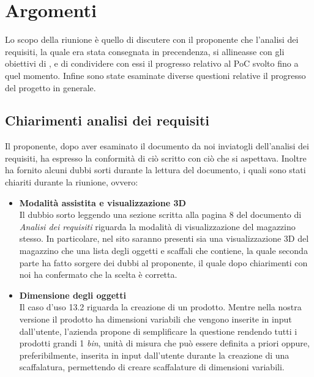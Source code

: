 \section{Argomenti} \label{sec:argomenti}
Lo scopo della riunione è quello di discutere con il proponente che l'analisi dei requisiti, la quale era stata consegnata in precendenza, si allineasse con gli obiettivi di \nomeAzienda, e di condividere con essi il progresso relativo al PoC svolto fino a quel momento. Infine sono state esaminate diverse questioni relative il progresso del progetto in generale.\\
\subsection{Chiarimenti analisi dei requisiti} \label{sec:argomenti:analisi}
    Il proponente, dopo aver esaminato il documento da noi inviatogli dell'analisi dei requisiti, ha espresso la conformità di ciò scritto con ciò che si aspettava. Inoltre ha fornito alcuni dubbi sorti durante la lettura del documento, i quali sono stati chiariti durante la riunione, ovvero:\\        \begin{itemize}
        \item \textbf{Modalità assistita e visualizzazione 3D} \\
        Il dubbio sorto leggendo una sezione scritta alla pagina 8 del documento di \textit{Analisi dei requisiti} riguarda la modalità di visualizzazione del magazzino stesso. In particolare, nel sito saranno presenti sia una visualizzazione 3D del magazzino che una lista degli oggetti e scaffali che contiene, la quale  seconda parte ha fatto sorgere dei dubbi al proponente, il quale dopo chiarimenti con noi ha confermato che la scelta è corretta. \\
        \item \textbf{Dimensione degli oggetti}\\
        Il caso d'uso 13.2 riguarda la creazione di un prodotto. Mentre nella nostra versione il prodotto ha dimensioni variabili che vengono inserite in input dall'utente, l'azienda propone di semplificare la questione rendendo tutti i prodotti grandi 1 \textit{bin}, unità di misura che può essere definita a priori oppure, preferibilmente, inserita in input dall'utente durante la creazione di una scaffalatura, permettendo di creare scaffalature di dimensioni variabili.\\
    \end{itemize}

